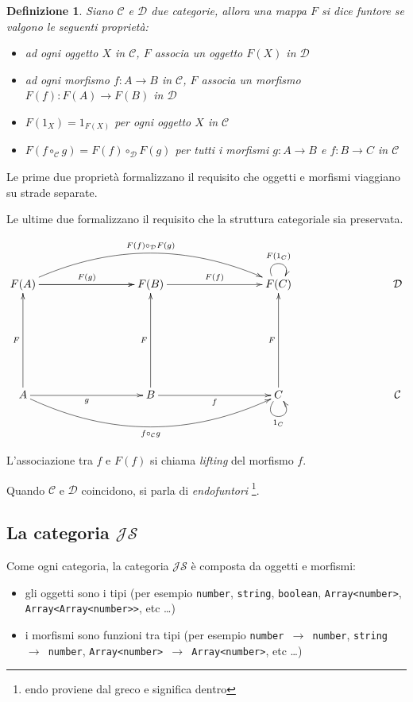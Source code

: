 \documentclass[12pt]{article}
\newtheorem{definition}{Definizione}
\begin{document}
\begin{definition}
Siano $\mathcal{C}$ e $\mathcal{D}$ due categorie, allora una mappa $F$ si dice \emph{funtore} se valgono le seguenti proprietà:

\begin{itemize}
  \item ad ogni oggetto $X$ in $\mathcal{C}$, $F$ associa un oggetto $F(X)$ in $\mathcal{D}$
  \item ad ogni morfismo $f: A \rightarrow B$ in $\mathcal{C}$, $F$ associa un morfismo $F(f): F(A) \rightarrow F(B)$ in $\mathcal{D}$
  \item $F(1_X) = 1_{F(X)}$ per ogni oggetto $X$ in $\mathcal{C}$
  \item $F(f \circ_\mathcal{C} g) = F(f) \circ_\mathcal{D} F(g)$ per tutti i morfismi $g: A \rightarrow B$ e $f: B \rightarrow C$ in $\mathcal{C}$
\end{itemize}

\end{definition}

Le prime due proprietà formalizzano il requisito che oggetti e morfismi viaggiano su strade separate.

Le ultime due formalizzano il requisito che la struttura categoriale sia preservata.

\[
\xymatrixrowsep{3cm}
\xymatrixcolsep{3cm}
\xymatrix{
  F(A) \ar[r]^{F(g)} \ar[r] \ar@/^1cm/[rr]^{F(f) \circ_\mathcal{D} F(g)} & F(B) \ar[r]^{F(f)} & F(C) \ar@(ul,ur)^{F(1_C)} & \mathcal{D} \\
  A \ar[u]^F \ar[r]_g \ar@/_1cm/[rr]_{f \circ_\mathcal{C} g}  & B \ar[u]^F \ar[r]_f & C \ar[u]^F \ar@(dl,dr)_{1_C} & \mathcal{C}
}
\]

L'associazione tra $f$ e $F(f)$ si chiama \emph{lifting} del morfismo $f$.

Quando $\mathcal{C}$ e $\mathcal{D}$ coincidono, si parla di \emph{endofuntori} \footnote{endo proviene dal greco e significa dentro}.

\subsection{La categoria $\mathcal{JS}$}

Come ogni categoria, la categoria $\mathcal{JS}$ è composta da oggetti e morfismi:

\begin{itemize}
  \item gli oggetti sono i tipi (per esempio \texttt{number}, \texttt{string}, \texttt{boolean}, \texttt{Array<number>}, \texttt{Array<Array<number>>}, etc \ldots)
  \item i morfismi sono funzioni tra tipi (per esempio \texttt{number $\rightarrow$ number}, \texttt{string $\rightarrow$ number}, \texttt{Array<number> $\rightarrow$ Array<number>}, etc \ldots)
\end{itemize}
\end{document}
